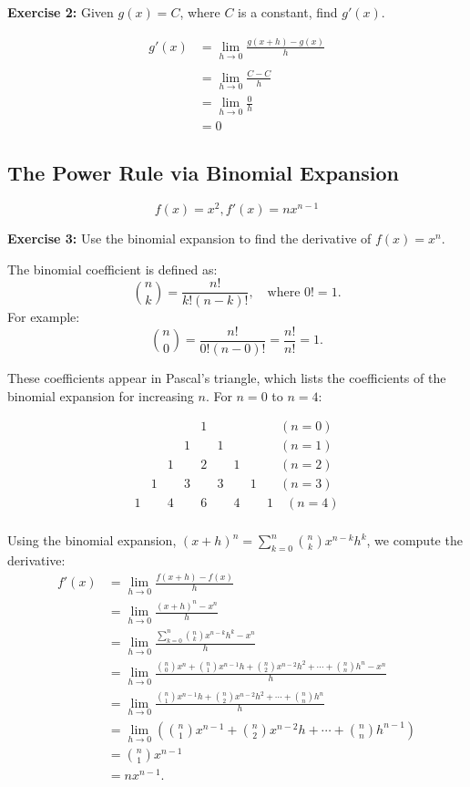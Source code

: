 \textbf{Exercise 2:} Given $g(x) = C$, where $C$ is a constant, find $g'(x)$.

\begin{align*}
g'(x) &= \lim_{h \to 0} \frac{g(x+h) - g(x)}{h} \\ \\
      &= \lim_{h \to 0} \frac{C - C}{h} \\
      &= \lim_{h \to 0} \frac{0}{h} \\
      &= 0
\end{align*}

\subsection{The Power Rule via Binomial Expansion}

\[f(x) = x^2, f'(x) = nx^{n-1}\]

\textbf{Exercise 3:} Use the binomial expansion to find the derivative of $f(x) = x^n$.

The binomial coefficient is defined as:
\[
\binom{n}{k} = \frac{n!}{k!(n-k)!}, \quad \text{where } 0! = 1.
\]
For example:
\[
\binom{n}{0} = \frac{n!}{0!(n-0)!} = \frac{n!}{n!} = 1.
\]

These coefficients appear in Pascal's triangle, which lists the coefficients of the binomial expansion for increasing \(n\). For \(n = 0\) to \(n = 4\):

\[
\begin{array}{ccccccccc}
 & & & & 1 & & & & \quad (n=0)\\[4pt]
 & & & 1 & & 1 & & & \quad (n=1)\\[4pt]
 & & 1 & & 2 & & 1 & & \quad (n=2)\\[4pt]
 & 1 & & 3 & & 3 & & 1 & \quad (n=3)\\[4pt]
1 & & 4 & & 6 & & 4 & & 1 \quad (n=4)\\
\end{array}
\]

Using the binomial expansion, \((x+h)^n = \sum_{k=0}^n \binom{n}{k} x^{n-k} h^k\), we compute the derivative:
\begin{align*}
f'(x) &= \lim_{h \to 0} \frac{f(x+h) - f(x)}{h} \\
      &= \lim_{h \to 0} \frac{(x+h)^n - x^n}{h} \\
      &= \lim_{h \to 0} \frac{\sum_{k=0}^n \binom{n}{k} x^{n-k} h^k - x^n}{h} \\
      &= \lim_{h \to 0} \frac{\binom{n}{0} x^n + \binom{n}{1} x^{n-1} h + \binom{n}{2} x^{n-2} h^2 + \cdots + \binom{n}{n} h^n - x^n}{h} \\
      &= \lim_{h \to 0} \frac{\binom{n}{1} x^{n-1} h + \binom{n}{2} x^{n-2} h^2 + \cdots + \binom{n}{n} h^n}{h} \\
      &= \lim_{h \to 0} \left( \binom{n}{1} x^{n-1} + \binom{n}{2} x^{n-2} h + \cdots + \binom{n}{n} h^{n-1} \right) \\
      &= \binom{n}{1} x^{n-1} \\
      &= n x^{n-1}.
\end{align*}

